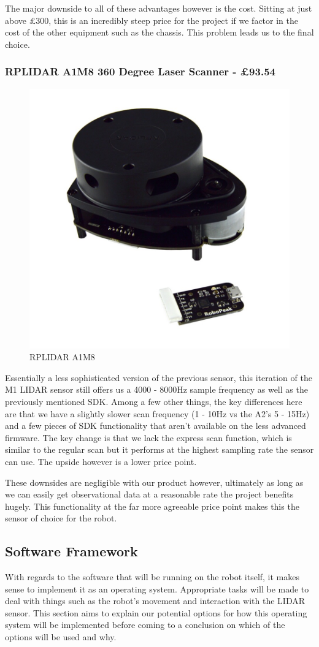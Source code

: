 					The major downside to all of these advantages however is the cost. Sitting at just above \pounds{300}, this is an incredibly steep price for the project if we factor in the cost of the other equipment such as the chassis. This problem leads us to the final choice.
					
					\subsubsection{RPLIDAR A1M8 360 Degree Laser Scanner - \pounds{93.54}}
					\begin{figure}[h]
						\centering
						\includegraphics[width=.3\linewidth]{ANALYSIS/rplidara1.jpg}
						\caption{RPLIDAR A1M8}
						\label{fig:rplidara1m8}
					\end{figure}
					Essentially a less sophisticated version of the previous sensor, this iteration of the M1 LIDAR sensor still offers us a 4000 - 8000Hz sample frequency as well as the previously mentioned SDK\cite{rplidara1m8datasheet}. Among a few other things, the key differences here are that we have a slightly slower scan frequency (1 - 10Hz vs the A2's 5 - 15Hz) and a few pieces of SDK functionality that aren't available on the less advanced firmware. The key change is that we lack the express scan function, which is similar to the regular scan but it performs at the highest sampling rate the sensor can use. The upside however is a lower price point\cite{rplidara1m8price}.
					
					These downsides are negligible with our product however, ultimately as long as we can easily get observational data at a reasonable rate the project benefits hugely. This functionality at the far more agreeable price point makes this the sensor of choice for the robot.
				
				\subsection{Software Framework}
				With regards to the software that will be running on the robot itself, it makes sense to implement it as an operating system. Appropriate tasks will be made to deal with things such as the robot's movement and interaction with the LIDAR sensor. This section aims to explain our potential options for how this operating system will be implemented before coming to a conclusion on which of the options will be used and why.
				
